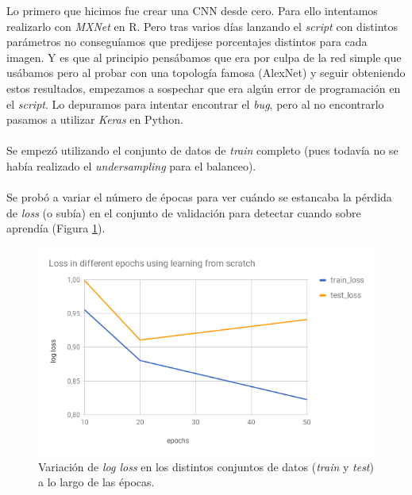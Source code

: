 Lo primero que hicimos fue crear una CNN  desde cero. Para ello intentamos realizarlo con \textit{MXNet} en R. Pero tras varios días lanzando el \textit{script} con distintos parámetros no conseguíamos que predijese porcentajes distintos para cada imagen. Y es que al principio pensábamos que era por culpa de la red simple que usábamos pero al probar con una topología famosa (AlexNet) y seguir obteniendo estos resultados, empezamos a sospechar que era algún error de programación en el \textit{script}. Lo depuramos para intentar encontrar el \textit{bug}, pero al no encontrarlo pasamos a utilizar \textit{Keras} en Python.
\\ \\
Se empezó utilizando el conjunto de datos de \textit{train} completo (pues todavía no se había realizado el \textit{undersampling} para el balanceo).
\\ \\
Se probó a variar el número de épocas para ver cuándo se estancaba la pérdida de \textit{loss} (o subía) en el conjunto de validación para detectar cuando sobre aprendía (Figura \ref{fig:loss-variation-learning-from-scratch}).

\begin{figure}[H]
	\centering
	\includegraphics[width=12cm]{img/loss-variation-learning-from-scratch}
	\caption{Variación de \textit{log loss} en los distintos conjuntos de datos (\textit{train} y \textit{test}) a lo largo de las épocas.}
	\label{fig:loss-variation-learning-from-scratch}
\end{figure}

